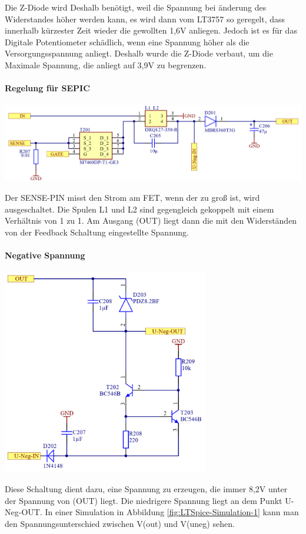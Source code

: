 \documentclass[paper=a4, 12pt]{scrreprt}
\begin{document}
			Die Z-Diode wird Deshalb benötigt, weil die Spannung bei änderung des Widerstandes höher werden kann, es wird dann vom LT3757 so geregelt, dass innerhalb kürzester Zeit wieder die gewollten 1,6V anliegen. Jedoch ist es für das Digitale Potentiometer schädlich, wenn eine Spannung höher als die Versorgungsspannung anliegt. Deshalb wurde die Z-Diode verbaut, um die Maximale Spannung, die anliegt auf 3,9V zu begrenzen.
			\paragraph{Regelung für SEPIC}
			\begin{adjustbox}{center,caption={Regelungsschaltung für LT3757},label={fig:regelung},nofloat=figure,vspace=\bigskipamount}
				\includegraphics[width=\textwidth]{img/Regelung_SEPIC.PNG}
			\end{adjustbox}
			Der SENSE-PIN misst den Strom am FET, wenn der zu groß ist, wird ausgeschaltet. Die Spulen L1 und L2 sind gegengleich gekoppelt mit einem Verhältnis von 1 zu 1. Am Ausgang (OUT) liegt dann die mit den Widerständen von der Feedback Schaltung eingestellte Spannung.
			\pagebreak
			\paragraph{Negative Spannung}
			\begin{adjustbox}{center,caption={Schaltung für Versorgung von OPV der Stromquelle},label={fig:neg-spg},nofloat=figure,vspace=\bigskipamount}
				\includegraphics[height=9cm]{img/Negative_Spannung.PNG}
			\end{adjustbox}
			Diese Schaltung dient dazu, eine Spannung zu erzeugen, die immer 8,2V unter der Spannung von (OUT) liegt. Die niedrigere Spannung liegt an dem Punkt U-Neg-OUT. In einer Simulation in Abbildung \ref{fig:LTSpice-Simulation-1} kann man den Spannungsunterschied zwischen V(out) und V(uneg) sehen.
\end{document}
